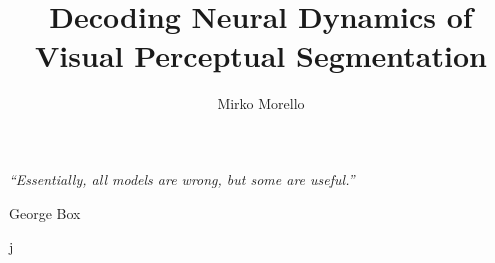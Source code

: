\documentclass{styles/tthesis}
\title{Decoding Neural Dynamics of Visual Perceptual Segmentation}
\author{Mirko Morello}
\begin{document}


\printfrontpage




\chapter*{\mbox{}}

\begin{flushright}
\thispagestyle{empty}
\null{}
{\it ``Essentially, all models are wrong, but some are useful.''

\vspace{10pt}
George Box
}
\null
\end{flushright}
%
\thispagestyle{empty}
\mbox{}
\newpage


 j


\tableofcontents
\listoffigures
\listoftables

\mainmatter











\label{Bibliography}


\end{document}
